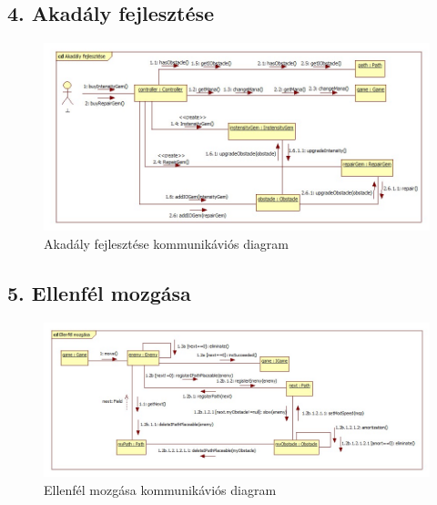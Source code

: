 \subsection{4. Akadály fejlesztése}
\begin{figure}[H]
\begin{center}
\includegraphics[width=17cm]{chapters/chapter05/images/cd_Akadaly_fejlesztese.jpg}
\caption{Akadály fejlesztése kommunikáviós diagram}
\label{fig:cd_Akadaly_fejlesztese}
\end{center}
\end{figure}

\subsection{5. Ellenfél mozgása}
\begin{figure}[H]
\begin{center}
\includegraphics[width=17cm]{chapters/chapter05/images/cd_Ellenfel_mozgasa.jpg}
\caption{Ellenfél mozgása kommunikáviós diagram}
\label{fig:cd_Ellenfel_mozgasa}
\end{center}
\end{figure}

